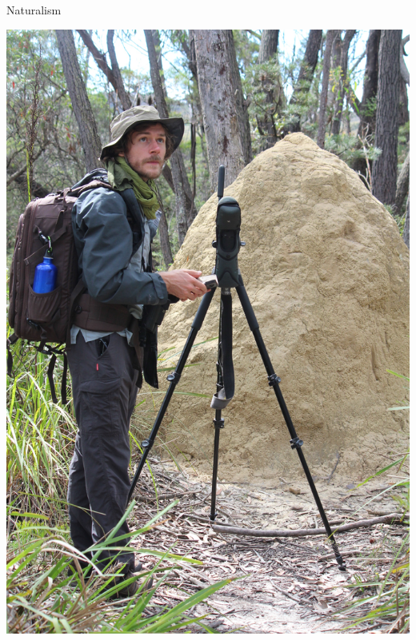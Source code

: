 \documentclass[10pt]{beamer}%
\begin{document}
\begin{frame}{Naturalism}
 
\includegraphics[height=0.8\textheight]{Figures/birding}
\end{frame}
\end{document}
